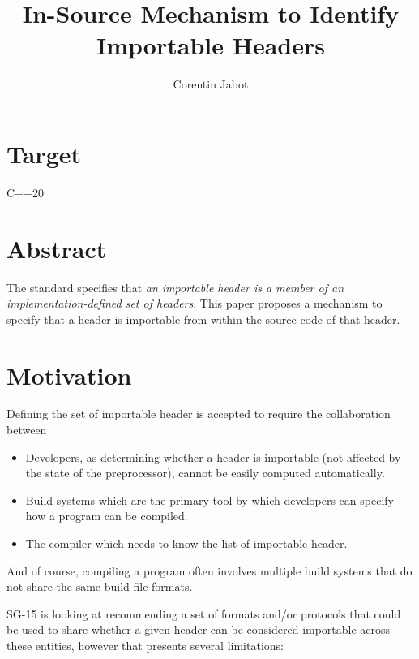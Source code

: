 \documentclass{wg21}
\title{In-Source Mechanism to Identify Importable Headers}
\author{Corentin Jabot}{corentin.jabot@gmail.com}
\begin{document}
\maketitle

\section{Target}

C++20

\section{Abstract}

The standard specifies that \emph{an importable header is a member of an implementation-defined set of headers}.
This paper proposes a mechanism to specify that a header is importable from within the source code of that header.

\section{Motivation}

Defining the set of importable header is accepted to require the collaboration between

\begin{itemize}
\item Developers, as determining whether a header is importable (not affected by the state of the preprocessor), cannot be easily computed automatically.
\item Build systems which are the primary tool by which developers can specify how a program can be compiled. 
\item The compiler which needs to know the list of importable header.
\end{itemize}

And of course, compiling a program often involves multiple build systems that do not share the same build file formats.

SG-15 is looking at recommending a set of formats and/or protocols that could be used to share whether a given header can be considered
importable across these entities, however that presents several limitations:
\end{document}
